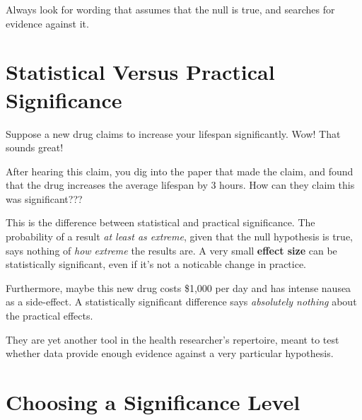\documentclass[
  letterpaper,
  DIV=11,
  numbers=noendperiod]{scrreprt}
\begin{document}
Always look for wording that assumes that the null is true, and searches
for evidence against it.

\hypertarget{statistical-versus-practical-significance}{%
\section{Statistical Versus Practical
Significance}\label{statistical-versus-practical-significance}}

Suppose a new drug claims to increase your lifespan significantly. Wow!
That sounds great!

After hearing this claim, you dig into the paper that made the claim,
and found that the drug increases the average lifespan by 3 hours. How
can they claim this was significant???

This is the difference between statistical and practical significance.
The probability of a result \emph{at least as extreme}, given that the
null hypothesis is true, says nothing of \emph{how extreme} the results
are. A very small \textbf{effect size} can be statistically significant,
even if it's not a noticable change in practice.

Furthermore, maybe this new drug costs \$1,000 per day and has intense
nausea as a side-effect. A statistically significant difference says
\emph{absolutely nothing} about the practical effects.

\begin{tcolorbox}[enhanced jigsaw, toptitle=1mm, colbacktitle=quarto-callout-important-color!10!white, breakable, leftrule=.75mm, left=2mm, opacityback=0, colframe=quarto-callout-important-color-frame, rightrule=.15mm, toprule=.15mm, bottomtitle=1mm, titlerule=0mm, title=\textcolor{quarto-callout-important-color}{\faExclamation}\hspace{0.5em}{p-values were never meant to be the goal of a study.}, arc=.35mm, colback=white, bottomrule=.15mm, opacitybacktitle=0.6, coltitle=black]

They are yet another tool in the health researcher's repertoire, meant
to test whether data provide enough evidence against a very particular
hypothesis.

\end{tcolorbox}

\hypertarget{choosing-a-significance-level}{%
\section{Choosing a Significance
Level}\label{choosing-a-significance-level}}
\end{document}
